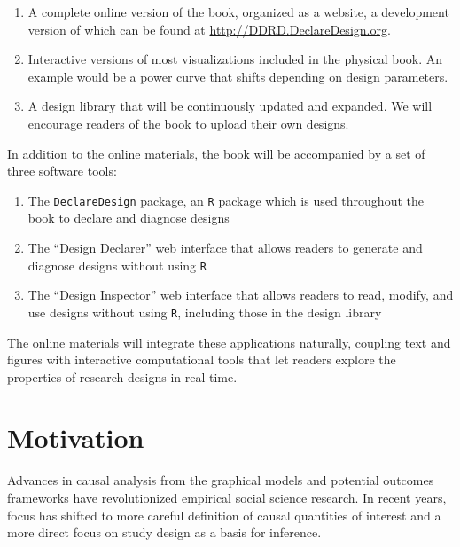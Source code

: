 \documentclass[11pt]{article}
\begin{document}
\begin{enumerate}
	\item A complete online version of the book, organized as a website, a development version of which can be found at \url{http://DDRD.DeclareDesign.org}.
	\item Interactive versions of most visualizations included in the physical book. An example would be a power curve that shifts depending on design parameters.
	\item A design library that will be continuously updated and expanded. We will encourage readers of the book to upload their own designs.
\end{enumerate}

In addition to the online materials, the book will be accompanied by a set of three software tools:

\begin{enumerate}
\item The \texttt{DeclareDesign} package, an \texttt{R}  package which is used throughout the book to declare and diagnose designs
\item The ``Design Declarer'' web interface that allows readers to generate and diagnose designs without using  \texttt{R}  
\item The ``Design Inspector'' web interface that allows readers to read, modify, and use designs without using  \texttt{R}, including those in the design library
\end{enumerate}

The online materials will integrate these applications naturally, coupling text and figures with interactive computational tools that let readers explore the properties of research designs in real time. 

\newpage

\section{Motivation}

Advances in causal analysis from the graphical models and potential outcomes frameworks have revolutionized empirical social science research. In recent years, focus has shifted to more careful definition of causal quantities of interest and a more direct focus on study design as a basis for inference.
\end{document}

